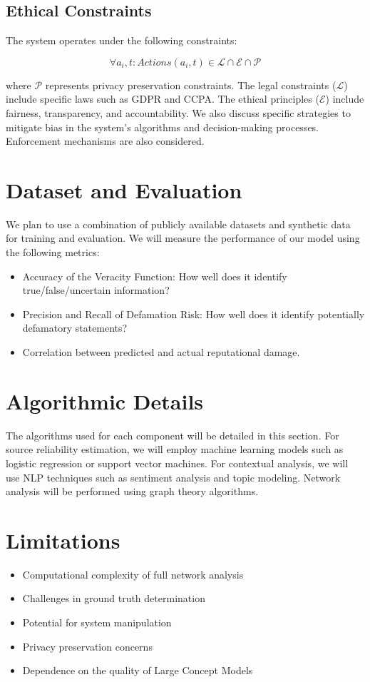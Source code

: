 \documentclass[12pt, a4paper]{article}
\begin{document}
\subsection{Ethical Constraints}
The system operates under the following constraints:

\begin{equation}
\forall a_i, t: Actions(a_i, t) \in \mathcal{L} \cap \mathcal{E} \cap \mathcal{P}
\end{equation}

where $\mathcal{P}$ represents privacy preservation constraints. The legal constraints ($\mathcal{L}$) include specific laws such as GDPR and CCPA. The ethical principles ($\mathcal{E}$) include fairness, transparency, and accountability. We also discuss specific strategies to mitigate bias in the system's algorithms and decision-making processes. Enforcement mechanisms are also considered.

\section{Dataset and Evaluation}
We plan to use a combination of publicly available datasets and synthetic data for training and evaluation. We will measure the performance of our model using the following metrics:
\begin{itemize}
    \item Accuracy of the Veracity Function: How well does it identify true/false/uncertain information?
    \item Precision and Recall of Defamation Risk: How well does it identify potentially defamatory statements?
    \item Correlation between predicted and actual reputational damage.
\end{itemize}

\section{Algorithmic Details}
The algorithms used for each component will be detailed in this section. For source reliability estimation, we will employ machine learning models such as logistic regression or support vector machines. For contextual analysis, we will use NLP techniques such as sentiment analysis and topic modeling. Network analysis will be performed using graph theory algorithms.

\section{Limitations}
\begin{itemize}
    \item Computational complexity of full network analysis
    \item Challenges in ground truth determination
    \item Potential for system manipulation
    \item Privacy preservation concerns
    \item Dependence on the quality of Large Concept Models
\end{itemize}
\end{document}
